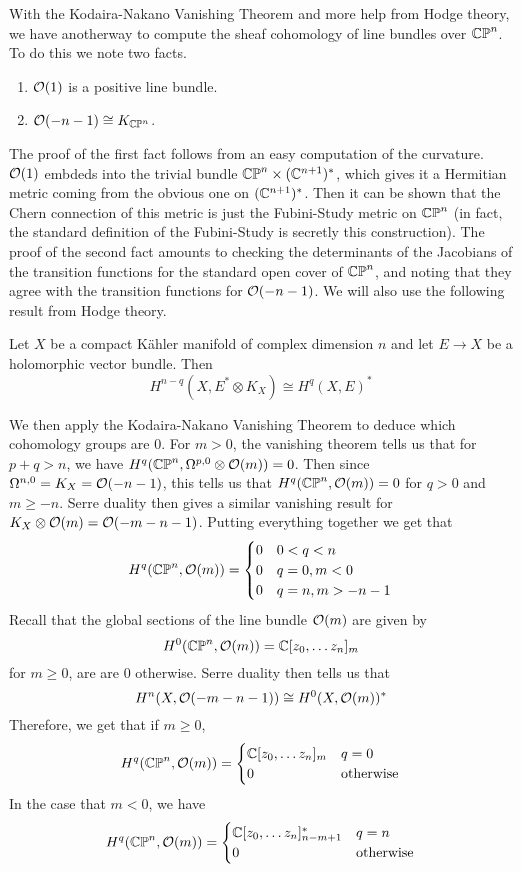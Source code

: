 %
With the Kodaira-Nakano Vanishing Theorem and more help from Hodge theory, we have
anotherway to compute the sheaf cohomology of line bundles over $\mathbb{CP}^n$. To
do this we note two facts.
\begin{enumerate}
  \item $\mathcal{O}(1)$ is a positive line bundle.
  \item $\mathcal{O}(-n-1) \cong K_{\mathbb{CP}^n}$.
\end{enumerate}
%
The proof of the first fact follows from an easy computation of the curvature.
$\mathcal{O}(1)$ embdeds into the trivial bundle $\mathbb{CP}^n \times (\mathbb{C}^{n+1})^*$, which gives
it a Hermitian metric coming from the obvious one on $(\mathbb{C}^{n+1})^*$. Then it can be
shown that the Chern connection of this metric is just the Fubini-Study metric on
$\mathbb{CP}^n$ (in fact, the standard definition of the Fubini-Study is secretly
this construction). The proof of the second fact amounts to checking the
determinants of the Jacobians of the transition functions for the standard open
cover of $\mathbb{CP}^n$, and noting that they agree with the transition functions
for $\mathcal{O}(-n-1)$. We will also use the following result from Hodge theory.
%
\begin{thm}
Let $X$ be a compact K\"ahler manifold of complex dimension $n$ and let $E \to X$
be a holomorphic vector bundle.
Then
\[
H^{n-q}(X, E^*\otimes K_X) \cong H^q(X,E)^*
\]
\end{thm}
%
We then apply the Kodaira-Nakano Vanishing Theorem to deduce which cohomology
groups are $0$. For $m > 0$, the vanishing theorem tells us that for $p+q > n$, we have
$H^q(\mathbb{CP}^n,\Omega^{p,0} \otimes \mathcal{O}(m)) = 0$. Then since $\Omega^{n,0} = K_X = \mathcal{O}(-n-1)$,
this tells us that $H^q(\mathbb{CP}^n,\mathcal{O}(m)) = 0$ for $q > 0$ and $m \geq -n$. Serre duality
then gives a similar vanishing result for $K_X \otimes \mathcal{O}(m) = \mathcal{O}(-m-n-1)$.
Putting everything together we get that
\[
H^q(\mathbb{CP}^n,\mathcal{O}(m)) = \begin{cases}
0 & 0 < q < n \\
0 & q = 0, m < 0 \\
0 & q = n , m > -n-1
\end{cases}
\]
Recall that the global sections of the line bundle $\mathcal{O}(m)$ are given by
\[
H^0(\mathbb{CP}^n,\mathcal{O}(m)) = \mathbb{C}[z_0,\ldots z_n]_m
\]
for $m \geq 0$, are are $0$ otherwise. Serre duality then tells us that
\[
H^n(X, \mathcal{O}(-m - n - 1)) \cong H^0(X,\mathcal{O}(m))^*
\]
Therefore, we get that if $m \geq 0$,
\[
H^q(\mathbb{CP}^n, \mathcal{O}(m)) = \begin{cases}
\mathbb{C}[z_0,\ldots z_n]_m & q = 0 \\
0 & \text{otherwise}
\end{cases}
\]
In the case that $m < 0$, we have
\[
H^q(\mathbb{CP}^n, \mathcal{O}(m)) = \begin{cases}
\mathbb{C}[z_0,\ldots z_n]_{n-m+1}^* & q = n \\
0 & \text{otherwise}
\end{cases}
\]
%